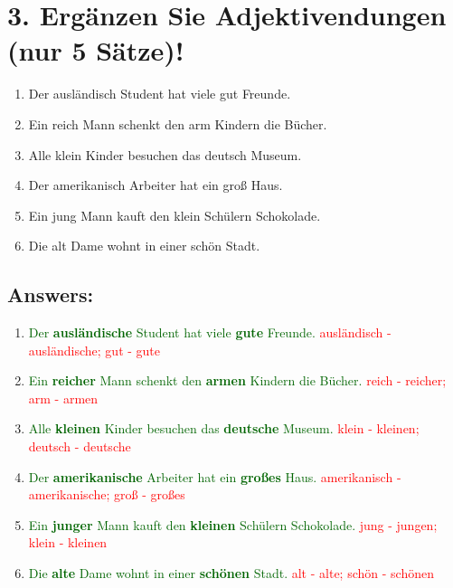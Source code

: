 \documentclass[12pt]{article}
\begin{document}
\section*{3. Ergänzen Sie Adjektivendungen (nur 5 Sätze)!}

\begin{enumerate}
    \item Der ausländisch\underline{\hspace{1cm}} Student hat viele gut\underline{\hspace{1cm}} Freunde.
    \item Ein reich\underline{\hspace{1cm}} Mann schenkt den arm\underline{\hspace{1cm}} Kindern die Bücher.
    \item Alle klein\underline{\hspace{1cm}} Kinder besuchen das deutsch\underline{\hspace{1cm}} Museum.
    \item Der amerikanisch\underline{\hspace{1cm}} Arbeiter hat ein groß\underline{\hspace{1cm}} Haus.
    \item Ein jung\underline{\hspace{1cm}} Mann kauft den klein\underline{\hspace{1cm}} Schülern Schokolade.
    \item Die alt\underline{\hspace{1cm}} Dame wohnt in einer schön\underline{\hspace{1cm}} Stadt.
\end{enumerate}

\subsection*{Answers:}
\begin{enumerate}
\item \textcolor{darkgreen}{Der \textbf{ausländische} Student hat viele \textbf{gute} Freunde.} \textcolor{red}{ausländisch - ausländische; gut - gute}
\item \textcolor{darkgreen}{Ein \textbf{reicher} Mann schenkt den \textbf{armen} Kindern die Bücher.} \textcolor{red}{reich - reicher; arm - armen}
\item \textcolor{darkgreen}{Alle \textbf{kleinen} Kinder besuchen das \textbf{deutsche} Museum.} \textcolor{red}{klein - kleinen; deutsch - deutsche}
\item \textcolor{darkgreen}{Der \textbf{amerikanische} Arbeiter hat ein \textbf{großes} Haus.} \textcolor{red}{amerikanisch - amerikanische; groß - großes}
\item \textcolor{darkgreen}{Ein \textbf{junger} Mann kauft den \textbf{kleinen} Schülern Schokolade.} \textcolor{red}{jung - jungen; klein - kleinen}
\item \textcolor{darkgreen}{Die \textbf{alte} Dame wohnt in einer \textbf{schönen} Stadt.} \textcolor{red}{alt - alte; schön - schönen}
\end{enumerate}
\end{document}
